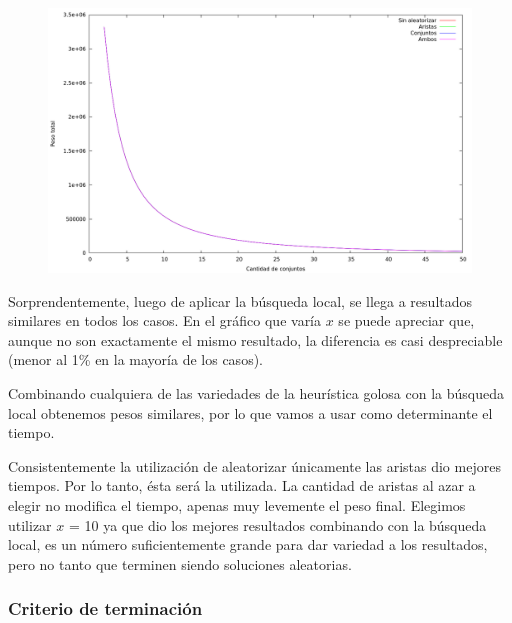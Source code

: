 \vspace*{0.5cm}

\vspace*{0.5cm}

\begin{figure}[H]
  \begin{center}
    \includegraphics[scale=0.35]{imagenes/grasp-local-k-peso.png}
  \end{center}
\end{figure}

\vspace*{0.5cm}

Sorprendentemente, luego de aplicar la búsqueda local, se llega a resultados
similares en todos los casos. En el gráfico que varía $x$ se puede apreciar
que, aunque no son exactamente el mismo resultado, la diferencia es casi
despreciable (menor al 1\% en la mayoría de los casos).


Combinando cualquiera de las variedades de la heurística golosa con la
búsqueda local obtenemos pesos similares, por lo que vamos a usar como
determinante el tiempo.

Consistentemente la utilización de aleatorizar únicamente las aristas dio
mejores tiempos. Por lo tanto, ésta será la utilizada. La cantidad de
aristas al azar a elegir no modifica el tiempo, apenas muy levemente el peso
final. Elegimos utilizar $x$ = 10 ya que dio los mejores resultados combinando
con la búsqueda local, es un número suficientemente grande para dar variedad a
los resultados, pero no tanto que terminen siendo soluciones aleatorias.

\subsubsection{Criterio de terminación}

